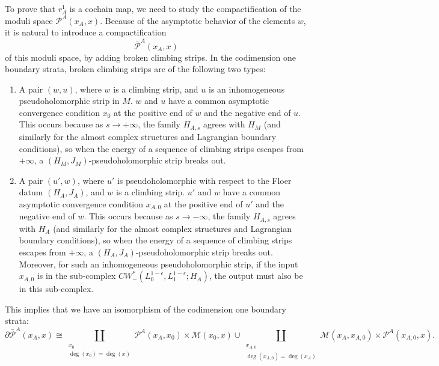 \documentclass{amsart}
\numberwithin{equation}{section}
\numberwithin{figure}{section}
\begin{document}
	To prove that $r^{1}_{A}$ is a cochain map, we need to study the compactification of the moduli space $\mathcal{P}^{A}(x_{A}, x)$. Because of the asymptotic behavior of the elements $w$, it is natural to introduce a compactification
\begin{equation*}
\bar{\mathcal{P}}^{A}(x_{A}, x)
\end{equation*}
of this moduli space, by adding broken climbing strips. In the codimension one boundary strata, broken climbing strips are of the following two types:
\begin{enumerate}[label=(\roman*)]

\item A pair $(w, u)$, where $w$ is a climbing strip, and $u$ is an inhomogeneous pseudoholomorphic strip in $M$. $w$ and $u$ have a common asymptotic convergence condition $x_{0}$ at the positive end of $w$ and the negative end of $u$. This occurs because as $s \to +\infty$, the family $H_{A, s}$ agrees with $H_{M}$ (and similarly for the almost complex structures and Lagrangian boundary conditions), so when the energy of a sequence of climbing strips escapes from $+\infty$, a $(H_{M}, J_{M})$-pseudoholomorphic strip breaks out.

\item A pair $(u', w)$, where $u'$ is pseudoholomorphic with respect to the Floer datum $(H_{A}, J_{A})$, and $w$ is a climbing strip. $u'$ and $w$ have a common asymptotic convergence condition $x_{A, 0}$ at the positive end of $u'$ and the negative end of $w$. This occurs because as $s \to -\infty$, the family $H_{A, s}$ agrees with $H_{A}$ (and similarly for the almost complex structures and Lagrangian boundary conditions), so when the energy of a sequence of climbing strips escapes from $+\infty$, a $(H_{A}, J_{A})$-pseudoholomorphic strip breaks out. Moreover, for such an inhomogeneous pseudoholomorphic strip, if the input $x_{A, 0}$ is in the sub-complex $CW^{*}_{-}(L_{0}^{1-\epsilon}, L_{1}^{1-\epsilon}; H_{A})$, the output must also be in this sub-complex.

\end{enumerate}
This implies that we have an isomorphism of the codimension one boundary strata:
\begin{equation}\label{boundary strata of moduli space of climbing strips}
\partial \bar{\mathcal{P}}^{A}(x_{A}, x) \cong \coprod_{\substack{x_{0}\\ \deg(x_{0}) = \deg(x)}} \mathcal{P}^{A}(x_{A}, x_{0}) \times \mathcal{M}(x_{0}, x) \cup \coprod_{\substack{x_{A, 0}\\ \deg(x_{A, 0}) = \deg(x_{A})}} \mathcal{M}(x_{A}, x_{A, 0}) \times \mathcal{P}^{A}(x_{A, 0}, x).
\end{equation} 
\end{document}
